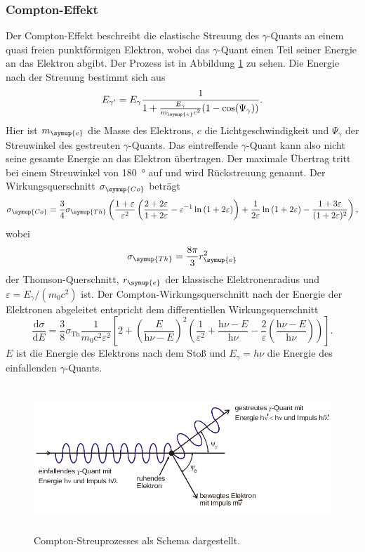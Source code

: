\subsubsection{Compton-Effekt}
Der Compton-Effekt beschreibt die elastische Streuung des $\gamma$-Quants an einem quasi freien punktförmigen Elektron, wobei das $\gamma$-Quant einen Teil seiner Energie an das Elektron abgibt.
Der Prozess ist in Abbildung \ref{fig:Compton} zu sehen.
Die Energie nach der Streuung bestimmt sich aus
\begin{equation}
E_{\gamma'}=E_{\gamma}\frac{1}{1+\frac{E_{\gamma}}{m_{\symup{e}} c^2}(1-\cos(\Psi_{\gamma}))}.
\end{equation}
Hier ist $m_{\symup{e}}$ die Masse des Elektrons, $c$ die Lichtgeschwindigkeit und $\Psi_{\gamma}$ der Streuwinkel des gestreuten $\gamma$-Quants.
Das eintreffende $\gamma$-Quant kann also nicht seine gesamte Energie an das Elektron übertragen.
Der maximale Übertrag tritt bei einem Streuwinkel von \SI{180}{\degree} auf und wird Rückstreuung genannt.
Der Wirkungsquerschnitt $\sigma_{\symup{Co}}$ beträgt
\begin{align*}
      \sigma_{\symup{Co}} = \frac{3}{4}\sigma_{\symup{Th}}\left(\frac{1+\varepsilon}{\varepsilon^2}\left(\frac{2+2\varepsilon}{1+2\varepsilon}-\varepsilon^{-1}\ln{(1+2\varepsilon)}\right)
      + \frac{1}{2\varepsilon}\ln{(1+2\varepsilon)} - \frac{1+3\varepsilon}{(1+2\varepsilon)^2}\right),
\end{align*}
wobei 
\begin{equation*}
\sigma_{\symup{Th}} =\frac{8\pi}{3}r_{\symup{e}}^2
\end{equation*}
der Thomson-Querschnitt, $r_{\symup{e}}$ der klassische Elektronenradius und $\varepsilon=E_{\gamma}/(m_0c^2)$ ist.
Der Compton-Wirkungsquerschnitt nach der Energie der Elektronen abgeleitet entspricht dem differentiellen Wirkungsquerschnitt
\begin{equation}
  \label{eq:wirk}
  \frac{\text{d}\sigma}{\text{d}E} = \frac{3}{8}\sigma_\text{Th} \frac{1}{m_0\text{c}^2\varepsilon^2}
    \left[ 2 + \left(\frac{E}{\text{h}\nu - E}\right)^2
      \left( \frac{1}{\varepsilon^2} + \frac{\text{h}\nu-E}{\text{h}\nu} - \frac{2}{\varepsilon}\left(\frac{\text{h}\nu-E}{\text{h}\nu} \right) \right)
    \right].
\end{equation}
$E$ ist die Energie des Elektrons nach dem Stoß und $E_\gamma=h\nu$ die Energie des einfallenden $\gamma$-Quants.
 \begin{figure}
   \centering
   \includegraphics[height=5.5cm]{content/pictures/Compton.png}
   \caption{Compton-Streuprozesses als Schema dargestellt.\cite{V18}}
   \label{fig:Compton}
 \end{figure}

